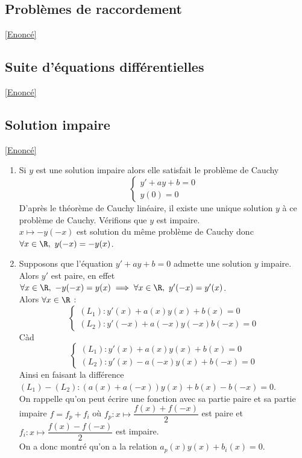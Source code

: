 \documentclass{book}
\begin{document}
	\subsection{Problèmes de raccordement}
	\label{sec:problemes-de-raccordement}
	\textcolor{blue}{\hyperref[Problème de raccordement]{[Enoncé]}}\\
	
	\subsection{Suite d'équations différentielles}
	\label{sec:suite-dequations-differentielles}
	\textcolor{blue}{\hyperref[Suite d'équations différentielles]{[Enoncé]}}\\
	
	\subsection{Solution impaire }
	\label{Solution impaire corrigé}
	\textcolor{blue}{\hyperref[Solution impaire]{[Enoncé]}}\\
	\begin{enumerate}[leftmargin=*]
		\item Si $y$ est une solution impaire alors elle satisfait le problème de Cauchy
		$$\begin{cases}
			y'+ay+b=0\\
			y(0)=0
		\end{cases}$$
		D'après le théorème de Cauchy linéaire, il existe une unique solution $y$ à ce problème de Cauchy. Vérifions que $y$ est impaire.\\
		$x\mapsto -y(-x)$ est solution du même problème de Cauchy donc $\forall x\in \R,\ y(-x)=-y(x)$.
		\item Supposons que l'équation $y'+ay+b=0$ admette une solution $y$ impaire. Alors $y'$ est paire, en effet $\forall x\in \R,\ -y(-x)=y(x)\implies \forall x\in \R,\ y'(-x)=y'(x)$.\\
		Alors $\forall x\in \R$ :
		$$\begin{cases}
			(L_1) : y'(x)+a(x)y(x)+b(x)=0\\
			(L_2) : y'(-x)+a(-x)y(-x)b(-x)=0
		\end{cases}$$
		Càd
		$$\begin{cases}
			(L_1) : y'(x)+a(x)y(x)+b(x)=0\\
			(L_2) : y'(x)-a(-x)y(x)+b(-x)=0
		\end{cases}$$
		Ainsi en faisant la différence $(L_1)-(L_2) : (a(x)+a(-x))y(x)+b(x)-b(-x)=0$.\\
		On rappelle qu'on peut écrire une fonction avec sa partie paire et sa partie impaire $f=f_p+f_i$ où $f_p:x\mapsto \dfrac{f(x)+f(-x)}{2}$ est paire et $f_i:x\mapsto \dfrac{f(x)-f(-x)}{2}$ est impaire.\\
		On a donc montré qu'on a la relation $a_p(x)y(x)+b_i(x)=0$.
	\end{enumerate}
	
\end{document}
